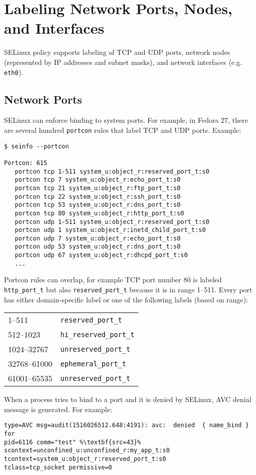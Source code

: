 \section{Labeling Network Ports, Nodes, and Interfaces}
\label{networkobjects}
SELinux policy supports labeling of TCP and UDP ports, network nodes
(represented by IP addresses and subnet masks), and network interfaces (e.g.
\texttt{eth0}).

\subsection{Network Ports}
SELinux can enforce binding to system ports. For example, in Fedora 27, there
are several hundred \texttt{portcon} rules that label TCP and UDP ports.
Example:
\begin{lstlisting}
$ seinfo --portcon

Portcon: 615
   portcon tcp 1-511 system_u:object_r:reserved_port_t:s0
   portcon tcp 7 system_u:object_r:echo_port_t:s0
   portcon tcp 21 system_u:object_r:ftp_port_t:s0
   portcon tcp 22 system_u:object_r:ssh_port_t:s0
   portcon tcp 53 system_u:object_r:dns_port_t:s0
   portcon tcp 80 system_u:object_r:http_port_t:s0
   portcon udp 1-511 system_u:object_r:reserved_port_t:s0
   portcon udp 1 system_u:object_r:inetd_child_port_t:s0
   portcon udp 7 system_u:object_r:echo_port_t:s0
   portcon udp 53 system_u:object_r:dns_port_t:s0
   portcon udp 67 system_u:object_r:dhcpd_port_t:s0
   ...
\end{lstlisting}
Portcon rules can overlap, for example TCP port number 80 is labeled
\texttt{http\_port\_t} but also \texttt{reserved\_port\_t} because it is in range
1--511. Every port has either domain-specific label or one of the following
labels (based on range):

\begin{tabular}{l l}
    1--511 & \texttt{reserved\_port\_t} \\
    512--1023 & \texttt{hi\_reserved\_port\_t} \\
    1024--32767 & \texttt{unreserved\_port\_t} \\
    32768--61000 & \texttt{ephemeral\_port\_t} \\
    61001--65535 & \texttt{unreserved\_port\_t} \\
\end{tabular}

When a process tries to bind to a port and it is denied by SELinux, AVC denial
message is generated. For example:
\begin{lstlisting}[escapechar=\%]
type=AVC msg=audit(1516026512.648:4191): avc:  denied  { name_bind } for
pid=6116 comm="test" %\textbf{src=43}% scontext=unconfined_u:unconfined_r:my_app_t:s0
tcontext=system_u:object_r:reserved_port_t:s0
tclass=tcp_socket permissive=0
\end{lstlisting}

